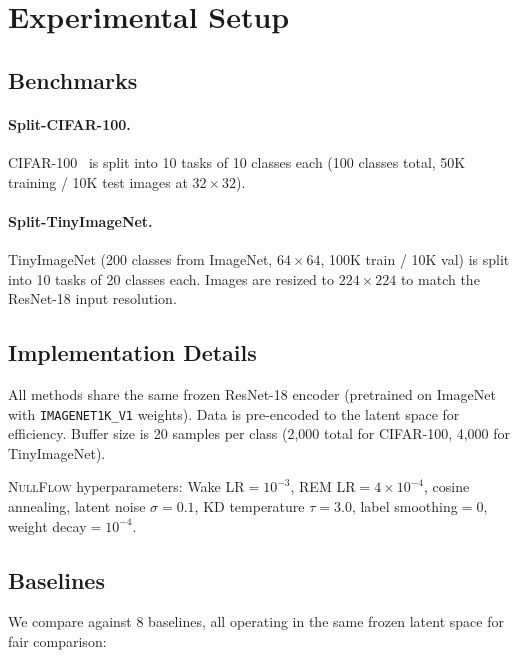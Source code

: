 \documentclass[10pt,twocolumn,letterpaper]{article}
\newcommand{\ours}{\textsc{NullFlow}}
\begin{document}
\section{Experimental Setup}
\label{sec:experiments}

\subsection{Benchmarks}

\paragraph{Split-CIFAR-100.} CIFAR-100~\cite{krizhevsky2009learning} is split into 10 tasks of 10 classes each (100 classes total, 50K training / 10K test images at $32 \times 32$).

\paragraph{Split-TinyImageNet.} TinyImageNet (200 classes from ImageNet, $64 \times 64$, 100K train / 10K val) is split into 10 tasks of 20 classes each. Images are resized to $224 \times 224$ to match the ResNet-18 input resolution.

\subsection{Implementation Details}

All methods share the same frozen ResNet-18 encoder (pretrained on ImageNet with \texttt{IMAGENET1K\_V1} weights). Data is pre-encoded to the latent space for efficiency. Buffer size is 20 samples per class (2,000 total for CIFAR-100, 4,000 for TinyImageNet).

\ours{} hyperparameters: Wake LR$=10^{-3}$, REM LR$=4\times10^{-4}$, cosine annealing, latent noise $\sigma=0.1$, KD temperature $\tau=3.0$, label smoothing$=0$, weight decay$=10^{-4}$.

\subsection{Baselines}

We compare against 8 baselines, all operating in the same frozen latent space for fair comparison:
\end{document}
